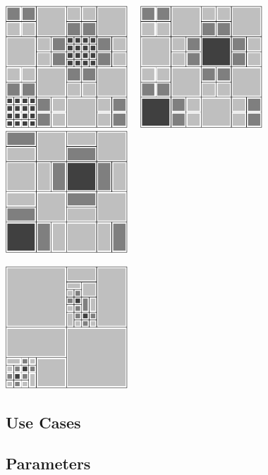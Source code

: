 \centerline{\includegraphics[width=1.8in]{amr4-4.eps} \ \
            \includegraphics[width=1.8in]{amr4-5.eps} \ \
            \includegraphics[width=1.8in]{amr4-6.eps}}
\centerline{\includegraphics[width=1.8in]{amr4-7.eps}}


\subsection{Use Cases}
\subsection{Parameters}

